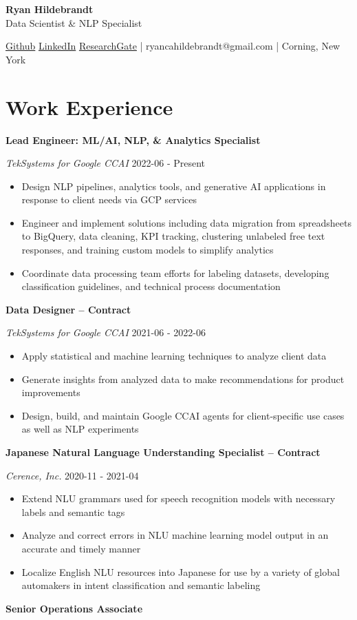 \documentclass[a4paper,9pt]{extarticle}
\begin{document}
\begin{center}\textbf{\Large Ryan Hildebrandt}\\[2pt]
Data Scientist \& NLP Specialist

\href{https://github.com/ryancahildebrandt}{Github}
\href{https://linkedin.com/in/rcah}{LinkedIn}
\href{https://researchgate.net/profile/Ryan-Hildebrandt}{ResearchGate}
 | ryancahildebrandt@gmail.com | Corning, New York
\end{center}

\section*{Work Experience}
\noindent\textbf{Lead Engineer: ML/AI, NLP, \& Analytics Specialist} 

\noindent\textit{TekSystems for Google CCAI} \hfill 2022-06 - Present
\begin{itemize}\item Design NLP pipelines, analytics tools, and generative AI applications in response to client needs via GCP services
\item Engineer and implement solutions including data migration from spreadsheets to BigQuery, data cleaning, KPI tracking, clustering unlabeled free text responses, and training custom models to simplify analytics
\item Coordinate data processing team efforts for labeling datasets, developing classification guidelines, and technical process documentation
\end{itemize}
\noindent\textbf{Data Designer -- Contract} 

\noindent\textit{TekSystems for Google CCAI} \hfill 2021-06 - 2022-06
\begin{itemize}\item Apply statistical and machine learning techniques to analyze client data
\item Generate insights from analyzed data to make recommendations for product improvements
\item Design, build, and maintain Google CCAI agents for client-specific use cases as well as NLP experiments
\end{itemize}
\noindent\textbf{Japanese Natural Language Understanding Specialist -- Contract} 

\noindent\textit{Cerence, Inc.} \hfill 2020-11 - 2021-04
\begin{itemize}\item Extend NLU grammars used for speech recognition models with necessary labels and semantic tags
\item Analyze and correct errors in NLU machine learning model output in an accurate and timely manner
\item Localize English NLU resources into Japanese for use by a variety of global automakers in intent classification and semantic labeling
\end{itemize}
\noindent\textbf{Senior Operations Associate} 
\end{document}
